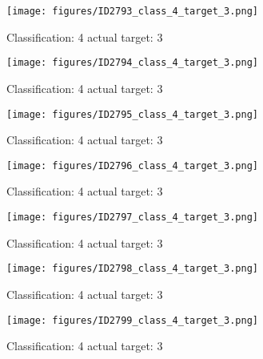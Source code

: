 \begin{figure}[h!]
\begin{center}
\texttt{[image: figures/ID2793\_class\_4\_target\_3.png]}
\end{center}
\caption{ Classification: 4 actual target: 3}
\label{fig:ID2793_class_4_target_3}
\end{figure}
\begin{figure}[h!]
\begin{center}
\texttt{[image: figures/ID2794\_class\_4\_target\_3.png]}
\end{center}
\caption{ Classification: 4 actual target: 3}
\label{fig:ID2794_class_4_target_3}
\end{figure}
\begin{figure}[h!]
\begin{center}
\texttt{[image: figures/ID2795\_class\_4\_target\_3.png]}
\end{center}
\caption{ Classification: 4 actual target: 3}
\label{fig:ID2795_class_4_target_3}
\end{figure}
\begin{figure}[h!]
\begin{center}
\texttt{[image: figures/ID2796\_class\_4\_target\_3.png]}
\end{center}
\caption{ Classification: 4 actual target: 3}
\label{fig:ID2796_class_4_target_3}
\end{figure}
\begin{figure}[h!]
\begin{center}
\texttt{[image: figures/ID2797\_class\_4\_target\_3.png]}
\end{center}
\caption{ Classification: 4 actual target: 3}
\label{fig:ID2797_class_4_target_3}
\end{figure}
\begin{figure}[h!]
\begin{center}
\texttt{[image: figures/ID2798\_class\_4\_target\_3.png]}
\end{center}
\caption{ Classification: 4 actual target: 3}
\label{fig:ID2798_class_4_target_3}
\end{figure}
\begin{figure}[h!]
\begin{center}
\texttt{[image: figures/ID2799\_class\_4\_target\_3.png]}
\end{center}
\caption{ Classification: 4 actual target: 3}
\label{fig:ID2799_class_4_target_3}
\end{figure}
